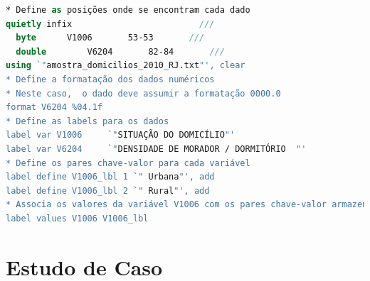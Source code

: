 \begin{lstlisting}[float = h, label={lst:do-file-sample},language=Stata, caption=Exemplo de comandos Stata utilizados para "traduzir" os microdados.]
* Define as posições onde se encontram cada dado
quietly infix                         ///
  byte		V1006		53-53		///
  double		V6204		82-84		///
using `"amostra_domicilios_2010_RJ.txt"', clear
* Define a formatação dos dados numéricos
* Neste caso,  o dado deve assumir a formatação 0000.0
format V6204 %04.1f
* Define as labels para os dados
label var V1006		`"SITUAÇÃO DO DOMICÍLIO"'
label var V6204		`"DENSIDADE DE MORADOR / DORMITÓRIO  "'
* Define os pares chave-valor para cada variável
label define V1006_lbl 1 `" Urbana"', add
label define V1006_lbl 2 `" Rural"', add
* Associa os valores da variável V1006 com os pares chave-valor armazenados em V1006_lbl
label values V1006 V1006_lbl
\end{lstlisting}




\chapter{Estudo de Caso}